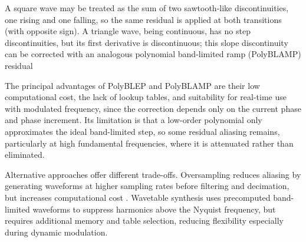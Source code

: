 A square wave
may be treated as the sum of two sawtooth-like discontinuities, one rising and one falling, so
the same residual is applied at both transitions (with opposite sign). A triangle wave, being 
continuous, has no step discontinuities,
but its first derivative is discontinuous; this slope discontinuity can be corrected with an
analogous polynomial band-limited ramp (PolyBLAMP) residual\cite{PolyBLAMP}

The principal advantages of PolyBLEP and PolyBLAMP are their low computational cost, the lack of 
lookup tables,
and suitability for real-time use with modulated frequency, since the correction depends
only on the current phase and phase increment. Its limitation is that a low-order polynomial
only approximates the ideal band-limited step, so some residual aliasing remains, particularly
at high fundamental frequencies, where it is attenuated rather than eliminated.

Alternative approaches offer different trade-offs. Oversampling reduces aliasing by generating 
waveforms at higher sampling rates before filtering and decimation, but increases computational cost
\cite{oversampling}. Wavetable synthesis uses precomputed band-limited waveforms to suppress harmonics 
above the Nyquist frequency, but requires additional memory and table selection, reducing flexibility 
especially during dynamic modulation\cite{wavetable}.


